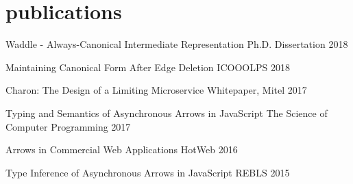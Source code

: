 \documentclass[]{clean-resume}
\begin{document}
\pagebreak
\section{publications}


\lineentry
  {Waddle - Always-Canonical Intermediate Representation}
  {Ph.D. Dissertation}
  {2018}

\lineentry
  {Maintaining Canonical Form After Edge Deletion}
  {ICOOOLPS}
  {2018}

\lineentry
  {Charon: The Design of a Limiting Microservice}
  {Whitepaper, Mitel}
  {2017}

\lineentry
  {Typing and Semantics of Asynchronous Arrows in JavaScript}
  {The Science of Computer Programming}
  {2017}

\lineentry
  {Arrows in Commercial Web Applications}
  {HotWeb}
  {2016}

\lineentry
  {Type Inference of Asynchronous Arrows in JavaScript}
  {REBLS}
  {2015}
\end{document}
